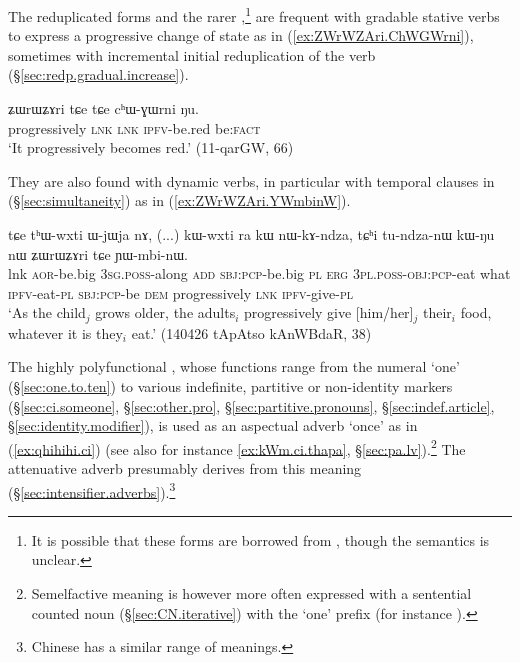 The reduplicated forms  and the rarer ,\footnote{It is possible that these forms are borrowed from , though the semantics is unclear. } are frequent with gradable stative verbs to express a progressive change of state as in (\ref{ex:ZWrWZAri.ChWGWrni}), sometimes with incremental initial reduplication of the verb (§\ref{sec:redp.gradual.increase}).


\begin{exe}
\ex \label{ex:ZWrWZAri.ChWGWrni}
\gll ʑɯrɯʑɤri tɕe tɕe cʰɯ-ɣɯrni ŋu. \\
progressively \textsc{lnk} \textsc{lnk} \textsc{ipfv}-be.red be:\textsc{fact} \\
\glt `It progressively becomes red.' (11-qarGW, 66)
\end{exe}

They are also found with dynamic verbs, in particular with temporal clauses in  (§\ref{sec:simultaneity}) as in (\ref{ex:ZWrWZAri.YWmbinW}).

\begin{exe}
\ex \label{ex:ZWrWZAri.YWmbinW}
\gll  tɕe tʰɯ-wxti ɯ-jɯja nɤ, (...) kɯ-wxti ra kɯ nɯ-kɤ-ndza, tɕʰi tu-ndza-nɯ kɯ-ŋu nɯ ʑɯrɯʑɤri tɕe ɲɯ-mbi-nɯ. \\
lnk  \textsc{aor}-be.big  \textsc{3sg}.\textsc{poss}-along \textsc{add} {  } \textsc{sbj}:\textsc{pcp}-be.big \textsc{pl} \textsc{erg} \textsc{3pl}.\textsc{poss}-\textsc{obj}:\textsc{pcp}-eat what \textsc{ipfv}-eat-\textsc{pl} \textsc{sbj}:\textsc{pcp}-be \textsc{dem} progressively \textsc{lnk} \textsc{ipfv}-give-\textsc{pl} \\
\glt  `As the child$_j$ grows older, the adults$_i$ progressively give [him/her]$_j$ their$_i$ food, whatever it is they$_i$ eat.' (140426 tApAtso kAnWBdaR, 38)
\end{exe}
 

The highly polyfunctional , whose functions range from the numeral `one' (§\ref{sec:one.to.ten}) to various indefinite, partitive or non-identity markers (§\ref{sec:ci.someone}, §\ref{sec:other.pro}, §\ref{sec:partitive.pronouns}, §\ref{sec:indef.article}, §\ref{sec:identity.modifier}), is used as an aspectual adverb `once' as in (\ref{ex:qhihihi.ci}) (see also for instance \ref{ex:kWm.ci.thapa}, §\ref{sec:pa.lv}).\footnote{Semelfactive meaning is however more often expressed with a sentential counted noun (§\ref{sec:CN.iterative}) with the `one' prefix (for instance ). } The attenuative adverb  presumably derives from this meaning (§\ref{sec:intensifier.adverbs}).\footnote{Chinese  has a similar range of meanings. }

